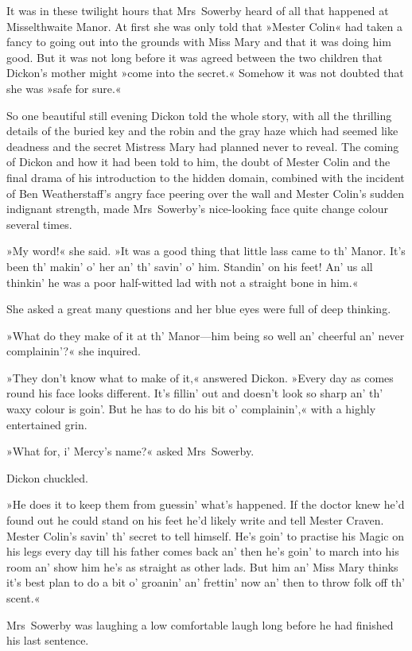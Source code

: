It was in these twilight hours that Mrs~Sowerby heard of all that happened at Misselthwaite Manor. At first she was only told that »Mester Colin« had taken a fancy to going out into the grounds with Miss Mary and that it was doing him good. But it was not long before it was agreed between the two children that Dickon's mother might »come into the secret.« Somehow it was not doubted that she was »safe for sure.«

So one beautiful still evening Dickon told the whole story, with all the thrilling details of the buried key and the robin and the gray haze which had seemed like deadness and the secret Mistress Mary had planned never to reveal. The coming of Dickon and how it had been told to him, the doubt of Mester Colin and the final drama of his introduction to the hidden domain, combined with the incident of Ben Weatherstaff's angry face peering over the wall and Mester Colin's sudden indignant strength, made Mrs~Sowerby's nice-looking face quite change colour several times.

»My word!« she said. »It was a good thing that little lass came to th' Manor. It's been th' makin' o' her an' th' savin' o' him. Standin' on his feet! An' us all thinkin' he was a poor half-witted lad with not a straight bone in him.«

She asked a great many questions and her blue eyes were full of deep thinking.

»What do they make of it at th' Manor—him being so well an' cheerful an' never complainin'?« she inquired.

»They don't know what to make of it,« answered Dickon. »Every day as comes round his face looks different. It's fillin' out and doesn't look so sharp an' th' waxy colour is goin'. But he has to do his bit o' complainin',« with a highly entertained grin.

»What for, i' Mercy's name?« asked Mrs~Sowerby.

Dickon chuckled.

»He does it to keep them from guessin' what's happened. If the doctor knew he'd found out he could stand on his feet he'd likely write and tell Mester Craven. Mester Colin's savin' th' secret to tell himself. He's goin' to practise his Magic on his legs every day till his father comes back an' then he's goin' to march into his room an' show him he's as straight as other lads. But him an' Miss Mary thinks it's best plan to do a bit o' groanin' an' frettin' now an' then to throw folk off th' scent.«

Mrs~Sowerby was laughing a low comfortable laugh long before he had finished his last sentence.

